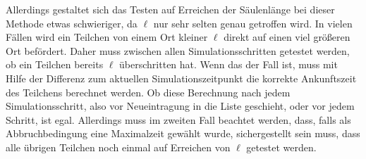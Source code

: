 Allerdings gestaltet sich das Testen auf Erreichen der Säulenlänge bei dieser Methode etwas schwieriger, da $\ell$ nur sehr selten genau getroffen wird. In vielen Fällen wird ein Teilchen von einem Ort kleiner $\ell$ direkt auf einen viel größeren Ort befördert. Daher muss zwischen allen Simulationsschritten getestet werden, ob ein Teilchen bereits $\ell$ überschritten hat. Wenn das der Fall ist, muss mit Hilfe der Differenz zum aktuellen Simulationszeitpunkt die korrekte Ankunftszeit des Teilchens berechnet werden.
Ob diese Berechnung nach jedem Simulationsschritt, also vor Neueintragung in die Liste geschieht, oder vor jedem Schritt, ist egal. Allerdings muss im zweiten Fall beachtet werden, dass, falls als Abbruchbedingung eine Maximalzeit gewählt wurde, sichergestellt sein muss, dass alle übrigen Teilchen noch einmal auf Erreichen von $\ell$ getestet werden.

